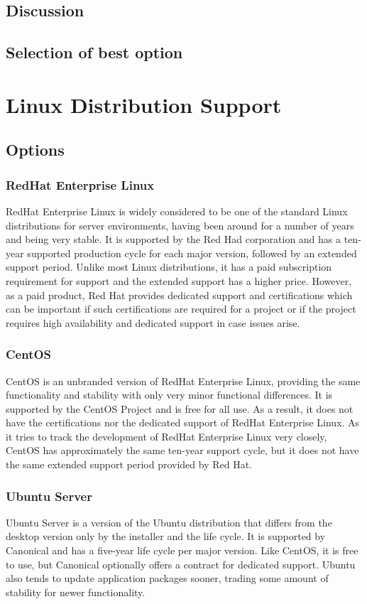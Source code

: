 \documentclass[10pt,letterpaper,onecolumn,journal]{IEEEtran}
\begin{document}
\subsection{Discussion}
\subsection{Selection of best option}

\section{Linux Distribution Support}
\subsection{Options}
\subsubsection{RedHat Enterprise Linux}
RedHat Enterprise Linux is widely considered to be one of the standard Linux distributions for server environments, having been around for a number of years and being very stable. It is supported by the Red Had corporation and has a ten-year supported production cycle for each major version, followed by an extended support period\cite{rhlife}. Unlike most Linux distributions, it has a paid subscription requirement for support and the extended support has a higher price. However, as a paid product, Red Hat provides dedicated support and certifications which can be important if such certifications are required for a project or if the project requires high availability and dedicated support in case issues arise.
\subsubsection{CentOS}
CentOS is an unbranded version of RedHat Enterprise Linux, providing the same functionality and stability with only very minor functional differences. It is supported by the CentOS Project and is free for all use. As a result, it does not have the certifications nor the dedicated support of RedHat Enterprise Linux. As it tries to track the development of RedHat Enterprise Linux very closely, CentOS has approximately the same ten-year support cycle\cite{centlife}, but it does not have the same extended support period provided by Red Hat.
\subsubsection{Ubuntu Server}
Ubuntu Server is a version of the Ubuntu distribution that differs from the desktop version only by the installer and the life cycle\cite{ubuntulife}. It is supported by Canonical and has a five-year life cycle per major version. Like CentOS, it is free to use, but Canonical optionally offers a contract for dedicated support. Ubuntu also tends to update application packages sooner, trading some amount of stability for newer functionality.
\end{document}
